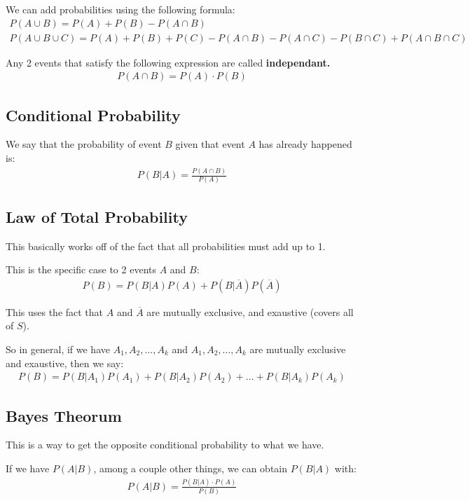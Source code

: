 \documentclass[12pt,letterpaper]{article} \usepackage{amsmath} \usepackage{graphicx} \usepackage[margin=1in]{geometry} \usepackage{longtable}  \usepackage{amssymb}
\begin{document}
	We can add probabilities using the following formula:
	\begin{align*}
		P(A\cup B) = P(A) + P(B) - P(A\cap B) \\
		P(A\cup B \cup C) = P(A)+P(B)+P(C)-P(A\cap B) - P(A\cap C) - P(B\cap C) + P(A\cap B\cap C)
	\end{align*}

	Any 2 events that satisfy the following expression are called \textbf{independant. }
	\begin{align*}
		P(A\cap B) = P(A)\cdot P(B)
	\end{align*}

	\subsection{Conditional Probability}
	We say that the probability of event $B$ given that event $A$ has already happened is:
	\begin{align*}
		P(B|A) = \frac{P(A\cap B)}{P(A)}
	\end{align*}
	
	\subsection{Law of Total Probability}
	This basically works off of the fact that all probabilities must add up to 1. 
	
	This is the specific case to 2 events $A$ and $B$:
	\begin{align*}
		P(B) = P(B|A)P(A) + P(B|\overline A)P(\overline A)
	\end{align*}

	This uses the fact that $A$ and $\overline A$ are mutually exclusive, and exaustive (covers all of $S$). 
	
	So in general, if we have $A_1, A_2, ..., A_k$ and $A_1, A_2, ..., A_k$ are mutually exclusive and exaustive, then we say:
	\begin{align*}
		P(B) = P(B|A_1)P(A_1) + P(B|A_2)P(A_2) + ... + P(B|A_k)P(A_k)
	\end{align*}
	
	\subsection{Bayes Theorum}
	This is a way to get the opposite conditional probability to what we have. 
	
	If we have $P(A|B)$, among a couple other things, we can obtain $P(B|A)$ with:
	\begin{align*}
		P(A|B) = \frac{P(B|A)\cdot P(A)}{P(B)}
	\end{align*}
	
\end{document}
